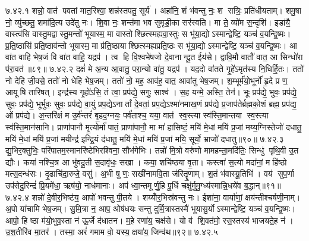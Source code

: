 ७.४२.१
शन्नो॒ वात॑ पवतां मात॒रिश्वा॒ शन्न॑स्तपतु॒ सूर्य॑। अहा॑नि॒ शं भ॑वन्तु नः॒ श रात्रिः॒ प्रति॑धीयताम्। शमु॒षा नो॒ व्यु॑च्छतु॒ शमा॑दि॒त्य उदे॑तु नः। शि॒वा नः॒ शन्त॑मा भव सुमृडी॒का सर॑स्वति। मा ते॒ व्यो॑म स॒न्दृशि॑। इडा॑यै॒ वास्त्व॑सि वास्तु॒मद्वास्तु॒मन्तो॑ भूयास्म॒ मा वास्तोश्छित्स्मह्यवा॒स्तुः स भू॑या॒द्योऽस्मान्द्वेष्टि॒ यञ्च॑ व॒यन्द्वि॒ष्मः। प्र॒ति॒ष्ठासि॑ प्रति॒ष्ठाव॑न्तो भूयास्म॒ मा प्र॑ति॒ष्ठायाश्छित्स्मह्यप्रति॒ष्ठः स भू॑या॒द्योऽस्मान्द्वेष्टि॒ यञ्च॑ व॒यन्द्वि॒ष्मः। आ वा॑त वाहि भेष॒जं वि वा॑त वाहि॒ यद्रप॑। त्व हि वि॒श्वभे॑षजो दे॒वानान्दू॒त ईय॑से। द्वावि॒मौ वातौ॑ वात॒ आ सिन्धो॑रा प॑रा॒वत॑॥८९॥
७.४२.२
दक्षं॑ मे अ॒न्य आ॒वातु॒ परा॒न्यो वा॑तु॒ यद्रप॑। यद॒दो वा॑तते गृ॒हे॑ऽमृत॑स्य नि॒धिर्\mbox{}हि॒तः। ततो॑ नो देहि जी॒वसे॒ ततो॑ नो धेहि भेष॒जम्। ततो॑ नो॒ मह॒ आव॑ह॒ वात॒ आवा॑तु भेष॒जम्। श॒म्भूर्म॑यो॒भूर्नो॑ हृ॒दे प्र ण॒ आयूषि तारिषत्। इन्द्र॑स्य गृ॒हो॑ऽसि॒ तं त्वा॒ प्रप॑द्ये॒ सगुः॒ साश्व॑। स॒ह यन्मे॒ अस्ति॒ तेन॑। भूः प्रप॑द्ये॒ भुवः॒ प्रप॑द्ये॒ सुवः॒ प्रप॑द्ये॒ भूर्भुवः॒ सुवः॒ प्रप॑द्ये वा॒युं प्रप॒द्येऽनार्तां दे॒वतां॒ प्रप॒द्येऽश्मा॑नमाख॒णं प्रप॑द्ये प्र॒जाप॑तेर्ब्रह्मको॒शं ब्रह्म॒ प्रप॑द्य॒ ओं प्रप॑द्ये। अ॒न्तरि॑क्षं म उ॒र्व॑न्तरं॑ बृ॒हद॒ग्नयः॒ पर्व॑ताश्च॒ यया॒ वात॑ स्व॒स्त्या स्व॑स्ति॒मान्तया स्व॒स्त्या स्व॑स्ति॒मान॑सानि। प्राणा॑पानौ मृ॒त्योर्मा॑ पातं॒ प्राणा॑पानौ॒ मा मा॑ हासिष्टं॒ मयि॑ मे॒धां मयि॑ प्र॒जां मय्य॒ग्निस्तेजो॑ दधातु॒ मयि॑ मे॒धां मयि॑ प्र॒जां मयीन्द्र॑ इन्द्रि॒यं द॑धातु॒ मयि॑ मे॒धां मयि॑ प्र॒जां मयि॒ सूर्यो॒ भ्राजो॑ दधातु॥९०॥
७.४२.३
द्यु॒भिर॒क्तुभिः॒ परि॑पातम॒स्मानरि॑ष्टेभिरश्विना॒ सौभ॑गेभिः। तन्नो॑ मि॒त्रो वरु॑णो मामहन्ता॒मदि॑तिः॒ सिन्धु॑ पृथि॒वी उ॒त द्यौः। कया॑ नश्चि॒त्र आ भु॑वदू॒ती स॒दावृ॑धः॒ सखा। कया॒ शचि॑ष्ठया वृ॒ता। कस्त्वा॑ स॒त्यो मदा॑नां॒ महि॑ष्ठो मत्स॒दन्ध॑सः। दृ॒ढाचि॑दा॒रुजे॒ वसु॑। अ॒भी षु णः॒ सखी॑नामवि॒ता ज॑रितॄ॒णाम्। श॒तं भ॑वास्यू॒तिभि॑। वय॑ सुप॒र्णा उप॑सेदु॒रिन्द्रं॑ प्रि॒यमे॑धा॒ ऋष॑यो॒ नाध॑मानाः। अप॑ ध्वा॒न्तमूर्णु॒हि पू॒र्धि चक्षु॑र्मुमु॒ग्ध्य॑स्मान्नि॒धये॑व ब॒द्धान्॥९१॥
७.४२.४
शन्नो॑ दे॒वीर॒भिष्ट॑य॒ आपो॑ भवन्तु पी॒तये। शय्योँर॒भिस्र॑वन्तु नः। ईशा॑ना॒ वार्या॑णां॒ क्षय॑न्तीश्चर्\mbox{}षणी॒नाम्। अ॒पो या॑चामि भेष॒जम्। सु॒मि॒त्रा न॒ आप॒ ओष॑धयः सन्तु दुर्मि॒त्रास्तस्मै॑ भूयासु॒र्योऽस्मान्द्वेष्टि॒ यञ्च॑ व॒यन्द्वि॒ष्मः। आपो॒ हि ष्ठा म॑यो॒भुव॒स्ता न॑ ऊ॒र्जे द॑धातन। म॒हे रणा॑य॒ चक्ष॑से। यो व॑ शि॒वत॑मो॒ रस॒स्तस्य॑ भाजयते॒ह न॑। उ॒श॒तीरि॑व मा॒तर॑। तस्मा॒ अरं॑ गमाम वो॒ यस्य॒ क्षया॑य॒ जिन्व॑थ॥९२॥
७.४२.५
